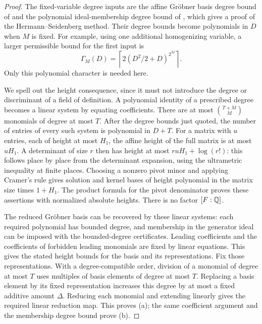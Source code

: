 \begin{proof}
The fixed-variable degree inputs are the affine Gr\"obner basis degree
bound of \cite[Corollary~8.3]{Dube1990} and the polynomial
ideal-membership degree bound of
\cite[Theorem~3.4]{Aschenbrenner2004}, which gives a proof of the
Hermann--Seidenberg method.  Their degree bounds become
polynomials in $D$ when $M$ is fixed.  For example, using one additional
homogenizing variable, a larger permissible bound for the first input is
\[
 \Gamma_M(D)=\left\lceil2(D^2/2+D)^{2^M}\right\rceil.
\]
Only this polynomial character is needed here.

We spell out the height consequence, since it must not introduce the
degree or discriminant of a field of definition.  A polynomial identity
of a prescribed degree becomes a linear system by equating coefficients.
There are at most $\binom{T+M}{M}$ monomials of degree at most $T$.
After the degree bounds just quoted, the number of entries of every such
system is polynomial in $D+T$.  For a matrix with $u$ entries, each of
height at most $H_1$, the affine height of the full matrix is at most
$uH_1$.  A determinant of size $r$ then has height at most
$r uH_1+\log(r!)$: this follows place by place from the determinant
expansion, using the ultrametric inequality at finite places.  Choosing
a nonzero pivot minor and applying Cramer's rule gives solution and kernel
bases of height polynomial in the matrix size times $1+H_1$.
The product formula for the pivot denominator proves these assertions
with normalized absolute heights.  There is no factor $[F:\mathbb Q]$.

The reduced Gr\"obner basis can be recovered by these linear systems:
each required polynomial has bounded degree, and membership in the
generator ideal can be imposed with the bounded-degree certificates.
Leading coefficients and the coefficients of forbidden leading monomials
are fixed by linear equations.  This gives the stated height bounds for
the basis and its representations.  Fix those representations.  With a
degree-compatible order, division of a monomial of degree at most $T$
uses multiples of basis elements of degree at most $T$.  Replacing a
basis element by its fixed representation increases this degree by at
most a fixed additive amount $\Delta$.  Reducing each monomial and
extending linearly gives the required linear reduction map.  This proves
\textup{(a)}; the same coefficient argument and the membership degree
bound prove \textup{(b)}.


\end{proof}

